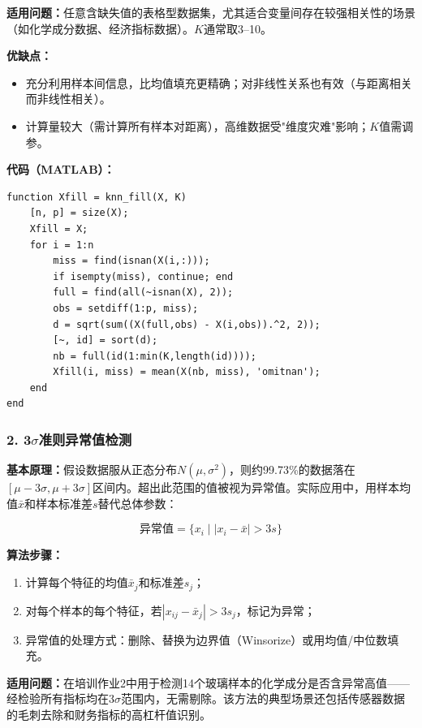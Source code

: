 \documentclass[12pt,a4paper]{ctexart}
\begin{document}
\textbf{适用问题：}任意含缺失值的表格型数据集，尤其适合变量间存在较强相关性的场景（如化学成分数据、经济指标数据）。$K$通常取3--10。

\textbf{优缺点：}
\begin{itemize}[leftmargin=*]
    \item[+] 充分利用样本间信息，比均值填充更精确；对非线性关系也有效（与距离相关而非线性相关）。
    \item[$-$] 计算量较大（需计算所有样本对距离），高维数据受"维度灾难"影响；$K$值需调参。
\end{itemize}

\textbf{代码（MATLAB）：}
\begin{lstlisting}
function Xfill = knn_fill(X, K)
    [n, p] = size(X);
    Xfill = X;
    for i = 1:n
        miss = find(isnan(X(i,:)));
        if isempty(miss), continue; end
        full = find(all(~isnan(X), 2));
        obs = setdiff(1:p, miss);
        d = sqrt(sum((X(full,obs) - X(i,obs)).^2, 2));
        [~, id] = sort(d);
        nb = full(id(1:min(K,length(id))));
        Xfill(i, miss) = mean(X(nb, miss), 'omitnan');
    end
end
\end{lstlisting}

\subsubsection{2. 3$\sigma$准则异常值检测}

\textbf{基本原理：}假设数据服从正态分布$N(\mu, \sigma^2)$，则约99.73\%的数据落在$[\mu-3\sigma, \mu+3\sigma]$区间内。超出此范围的值被视为异常值。实际应用中，用样本均值$\bar{x}$和样本标准差$s$替代总体参数：

\begin{equation}
\text{异常值} = \{x_i \mid |x_i - \bar{x}| > 3s\}
\end{equation}

\textbf{算法步骤：}
\begin{enumerate}[label=(\arabic*), leftmargin=*]
    \item 计算每个特征的均值$\bar{x}_j$和标准差$s_j$；
    \item 对每个样本的每个特征，若$|x_{ij} - \bar{x}_j| > 3s_j$，标记为异常；
    \item 异常值的处理方式：删除、替换为边界值（Winsorize）或用均值/中位数填充。
\end{enumerate}

\textbf{适用问题：}在培训作业2中用于检测14个玻璃样本的化学成分是否含异常高值——经检验所有指标均在3$\sigma$范围内，无需剔除。该方法的典型场景还包括传感器数据的毛刺去除和财务指标的高杠杆值识别。
\end{document}
